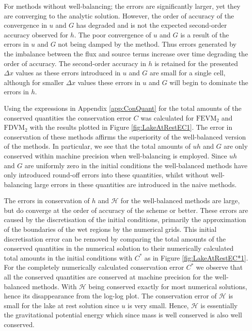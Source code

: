 For methods without well-balancing; the errors are significantly larger, yet they are converging to the analytic solution. However, the order of accuracy of the convergence in $u$ and $G$ has degraded and is not the expected second-order accuracy observed for $h$. The poor convergence of $u$ and $G$ is a result of the errors in $u$ and $G$ not being damped by the method. Thus errors generated by the imbalance between the flux and source terms increase over time degrading the order of accuracy. The second-order accuracy in $h$ is retained for the presented $\Delta x$ values as these errors introduced in $u$ and $G$ are small for a single cell, although for smaller $\Delta x$ values these errors in $u$ and $G$ will begin to dominate the errors in $h$. 


Using the expressions in Appendix \ref{app:ConQuant} for the total amounts of the conserved quantities the conservation error $C$ was calculated for $\text{FEVM}_2$ and $\text{FDVM}_2$ with the results plotted in Figure \ref{fig:LakeAtRestEC1}. The error in conservation of these methods affirms the superiority of the well-balanced version of the methods. In particular, we see that the total amounts of $uh$ and $G$ are only conserved within machine precision when well-balancing is employed. Since $uh$ and $G$ are uniformly zero in the initial conditions the well-balanced methods have only introduced round-off errors into these quantities, whilst without well-balancing large errors in these quantities are introduced in the naive methods. 

The errors in conservation of $h$ and $\mathcal{H}$ for the well-balanced methods are large, but do converge at the order of accuracy of the scheme or better. These errors are caused by the discretisation of the initial conditions, primarily the approximation of the boundaries of the wet regions by the numerical grids. This initial discretisation error can be removed by comparing the total amounts of the conserved quantities in the numerical solution to their numerically calculated total amounts in the initial conditions with $C^*$ as in Figure \ref{fig:LakeAtRestEC*1}. For the completely numerically calculated conservation error $C^*$ we observe that all the conserved quantities are conserved at machine precision for the well-balanced methods. With $\mathcal{H}$ being conserved exactly for most numerical solutions, hence its disappearance from the log-log plot. The conservation error of $\mathcal{H}$ is small for the lake at rest solution since $u$ is very small. Hence, $\mathcal{H}$ is essentially the gravitational potential energy which since mass is well conserved is also well conserved.


